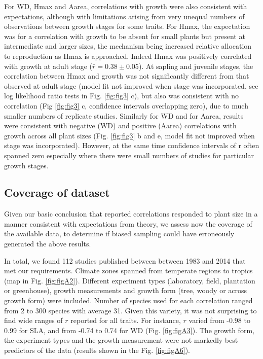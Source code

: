 \documentclass[a4paper,11pt]{article}
\begin{document}
For WD, Hmax and Aarea, correlations with growth were also consistent with expectations, although with limitations arising from very unequal numbers of observations between growth stages for some traits. For Hmax, the expectation was for a correlation with growth to be absent for small plants but present at intermediate and larger sizes, the mechanism being increased relative allocation to reproduction as Hmax is approached. Indeed Hmax was positively correlated with growth at adult stage ($\bar{r}= 0.38 \pm 0.05$). At sapling and juvenile stages, the correlation between Hmax and growth was not significantly different from that observed at adult stage (model fit not improved when stage was incorporated, see log likelihood ratio tests in Fig. \ref{fig:fig3} c), but also was consistent with no correlation (Fig \ref{fig:fig3} c, confidence intervals overlapping zero), due to much smaller numbers of replicate studies. Similarly for WD and for Aarea, results were consistent with negative (WD) and positive (Aarea) correlations with growth across all plant sizes (Fig. \ref{fig:fig3} b and e, model fit not improved when stage was incorporated). However, at the same time confidence intervals of r often spanned zero especially where there were small numbers of studies for particular growth stages.



\subsection*{Coverage of dataset}

Given our basic conclusion that reported correlations responded to plant size in a manner consistent with expectations from theory, we assess now the coverage of the available data, to determine if biased sampling could have erroneously generated the above results.

In total, we found 112 studies published between between 1983 and 2014 that met our requirements. Climate zones spanned from temperate regions to  tropics (map in Fig. \ref{fig:figA2}). Different experiment types (laboratory, field, plantation or greenhouse), growth measurements and growth form (tree, woody or across growth form) were included. Number of species used for each correlation ranged from 2 to 300 species with average 31. Given this variety, it was not surprising to find wide ranges of $r$ reported for all traits. For instance, $r$ varied from -0.98 to 0.99 for SLA, and from -0.74 to 0.74 for WD (Fig. \ref{fig:figA3}). The growth form, the experiment types and the growth measurement were not markedly best predictors of the data (results shown in the Fig. \ref{fig:figA6}).
\end{document}
